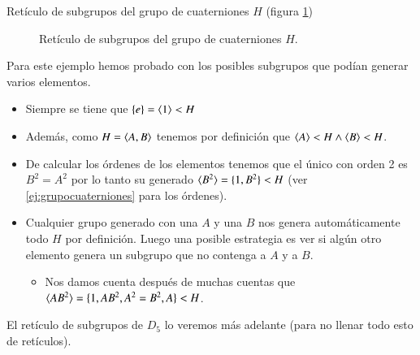 \begin{ej}
	Retículo de subgrupos del grupo de cuaterniones $H$ (figura \ref{fig:reticulocuaterniones})
	
	\begin{figure}[h]
		\centering
		\caption{Retículo de subgrupos del grupo de cuaterniones $H$.}
		\label{fig:reticulocuaterniones}
	\end{figure}

Para este ejemplo hemos probado con los posibles subgrupos que podían generar varios elementos.

\begin{itemize}
	\item Siempre se tiene que $\{e\} = \langle1\rangle < H$
	\item Además, como $H = \langle A,B\rangle$ tenemos por definición que $\langle A\rangle < H \land \langle B\rangle < H$.
	\item De calcular los órdenes de los elementos tenemos que el único con orden 2 es $B^2 = A^2$ por lo tanto su generado $\langle B^2\rangle = \{1, B^2\} < H$ (ver \autoref{ej:grupocuaterniones} para los órdenes).
	\item Cualquier grupo generado con una $A$ y una $B$ nos genera automáticamente todo $H$ por definición. Luego una posible estrategia es ver si algún otro elemento genera un subgrupo que no contenga a $A$ y a $B$.
	\begin{itemize}
		\item Nos damos cuenta después de muchas cuentas que $\langle AB^2\rangle = \{1, AB^2, A^2 = B^2, A\} < H$.
	\end{itemize}
\end{itemize}
\end{ej}

El retículo de subgrupos de $D_5$ lo veremos más adelante (para no llenar todo esto de retículos).

